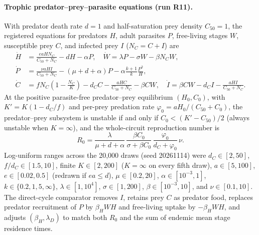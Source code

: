 \paragraph{Trophic predator--prey--parasite equations (run R11).}
With predator death rate $d = 1$ and half-saturation prey density $C_{50} = 1$, the registered equations for predators $H$, adult parasites $P$, free-living stages $W$, susceptible prey $C$, and infected prey $I$ ($N_C = C + I$) are
\begin{equation}\label{eq:dyn-r11-odes}
\begin{aligned}
\dot{H} &= \frac{eaH N_C}{C_{50} + N_C} - dH - \alpha P, \quad
\dot{W} = \lambda P - \sigma W - \beta N_C W, \\
\dot{P} &= \frac{\nu aHI}{C_{50} + N_C} - (\mu + d + \alpha)P - \alpha\frac{k + 1}{k}\frac{P^2}{H}, \\
\dot{C} &= f N_C\!\left(1 - \frac{N_C}{K}\right) - d_C C - \frac{aHC}{C_{50} + N_C} - \beta CW, \quad
\dot{I} = \beta CW - d_C I - \frac{aHI}{C_{50} + N_C}.
\end{aligned}
\end{equation}
At the positive parasite-free predator--prey equilibrium $(H_0, C_0)$, with $K' = K(1 - d_C/f)$ and per-prey predation rate $\varphi_0 = aH_0/(C_{50} + C_0)$, the predator--prey subsystem is unstable if and only if $C_0 < (K' - C_{50})/2$ (always unstable when $K = \infty$), and the whole-circuit reproduction number is
\begin{equation}\label{eq:dyn-r11-r0}
R_0 = \frac{\lambda}{\mu + d + \alpha}\,\frac{\beta C_0}{\sigma + \beta C_0}\,\frac{\varphi_0}{d_C + \varphi_0}\,\nu.
\end{equation}
Log-uniform ranges across the 20,000 draws (seed 20261114) were $d_C \in [2, 50]$, $f/d_C \in [1.5, 10]$, finite $K \in [2, 200]$ ($K = \infty$ on every fifth draw), $a \in [5, 100]$, $e \in [0.02, 0.5]$ (redrawn if $ea \le d$), $\mu \in [0.2, 20]$, $\alpha \in [10^{-3}, 1]$, $k \in \{0.2, 1, 5, \infty\}$, $\lambda \in [1, 10^4]$, $\sigma \in [1, 200]$, $\beta \in [10^{-3}, 10]$, and $\nu \in [0.1, 10]$. The direct-cycle comparator removes $I$, retains prey $C$ as predator food, replaces predator recruitment of $P$ by $\beta_H WH$ and free-living uptake by $-\beta_H WH$, and adjusts $(\beta_H, \lambda_D)$ to match both $R_0$ and the sum of endemic mean stage residence times.

